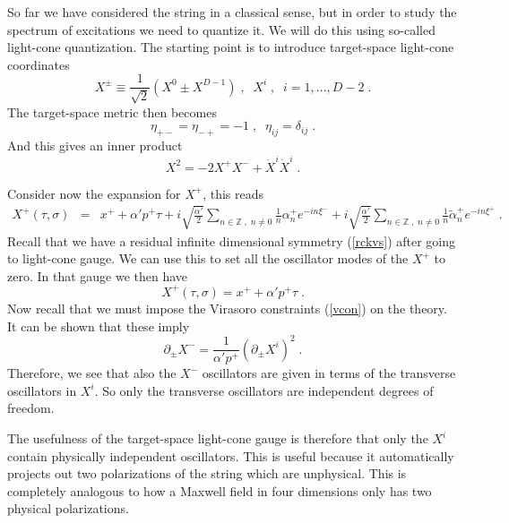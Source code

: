 \documentclass[11pt,a4paper]{article}
\numberwithin{equation}{section}
\numberwithin{table}{section}\setlength{\multlinegap}{25pt}
\newcommand{\bea}{\begin{eqnarray}}  \newcommand{\eea}{\end{eqnarray}}
\newcommand{\be}{\begin{equation}}
\newcommand{\ee}{\end{equation}}
\begin{document}
So far we have considered the string in a classical sense, but in order to study the spectrum of excitations we need to quantize it. We will do this using so-called light-cone quantization. The starting point is to introduce target-space light-cone coordinates
\be
X^{\pm} \equiv \frac{1}{\sqrt{2}} \left(X^0 \pm X^{D-1} \right) \;,\;\; X^i \;,\;\; i=1,...,D-2 \;.
\ee
The target-space metric then becomes
\be
\eta_{+-} = \eta_{-+} = -1 \;, \;\; \eta_{ij} = \delta_{ij} \;.
\ee
And this gives an inner product
\be
X^2 = -2 X^+ X^- + \dot X^i \dot X^i \;.
\ee

Consider now the expansion for $X^+$, this reads
\bea
X^+\left(\tau,\sigma\right) &=& x^+ + \alpha' p^+ \tau + i \sqrt{\frac{\alpha'}{2}} \sum_{n \in \mathbb{Z} \;,\; n \neq 0} \frac{1}{n} \alpha^+_n e^{-in \xi^-} + i \sqrt{\frac{\alpha'}{2}} \sum_{n \in \mathbb{Z} \;,\; n \neq 0} \frac{1}{n} \tilde{\alpha}^+_n e^{-in \xi^+} \;.
\eea
Recall that we have a residual infinite dimensional symmetry (\ref{rckvs}) after going to light-cone gauge. We can use this to set all the oscillator modes of the $X^+$ to zero. In that gauge we then have
\be
X^+\left(\tau,\sigma\right)  = x^+ + \alpha' p^+ \tau \;.
\ee
Now recall that we must impose the Virasoro constraints (\ref{vcon}) on the theory. It can be shown that these imply
\be
\partial_{\pm} X^- = \frac{1}{\alpha' p^+} \left(\partial_{\pm}X^i \right)^2 \;.
\label{vconxm}
\ee
Therefore, we see that also the $X^-$ oscillators are given in terms of the transverse oscillators in $X^i$. So only the transverse oscillators are independent degrees of freedom. 

The usefulness of the target-space light-cone gauge is therefore that only the $X^i$ contain physically independent oscillators. This is useful because it automatically projects out two polarizations of the string which are unphysical. This is completely analogous to how a Maxwell field in four dimensions only has two physical polarizations. 
\end{document}
